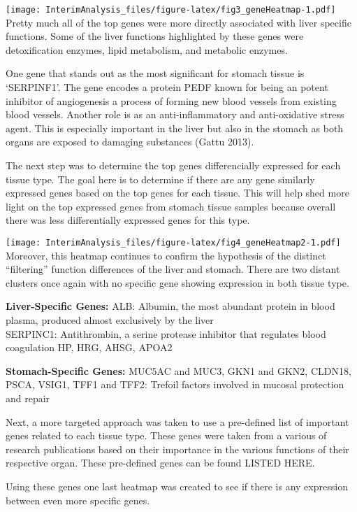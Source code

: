\documentclass[
]{article}
\begin{document}
\texttt{[image: InterimAnalysis\_files/figure-latex/fig3\_geneHeatmap-1.pdf]}
Pretty much all of the top genes were more directly associated with
liver specific functions. Some of the liver functions highlighted by
these genes were detoxification enzymes, lipid metabolism, and metabolic
enzymes.

One gene that stands out as the most significant for stomach tissue is
`SERPINF1'. The gene encodes a protein PEDF known for being an potent
inhibitor of angiogenesis a process of forming new blood vessels from
existing blood vessels. Another role is as an anti-inflammatory and
anti-oxidative stress agent. This is especially important in the liver
but also in the stomach as both organs are exposed to damaging
substances (Gattu 2013).

The next step was to determine the top genes differencially expressed
for each tissue type. The goal here is to determine if there are any
gene similarly expressed genes based on the top genes for each tissue.
This will help shed more light on the top expressed genes from stomach
tissue samples because overall there was less differentially expressed
genes for this type.

\texttt{[image: InterimAnalysis\_files/figure-latex/fig4\_geneHeatmap2-1.pdf]}
Moreover, this heatmap continues to confirm the hypothesis of the
distinct ``filtering'' function differences of the liver and stomach.
There are two distant clusters once again with no specific gene showing
expression in both tissue type.

\textbf{Liver-Specific Genes:} ALB: Albumin, the most abundant protein
in blood plasma, produced almost exclusively by the liver\\
SERPINC1: Antithrombin, a serine protease inhibitor that regulates blood
coagulation HP, HRG, AHSG, APOA2

\textbf{Stomach-Specific Genes:} MUC5AC and MUC3, GKN1 and GKN2, CLDN18,
PSCA, VSIG1, TFF1 and TFF2: Trefoil factors involved in mucosal
protection and repair

Next, a more targeted approach was taken to use a pre-defined list of
important genes related to each tissue type. These genes were taken from
a various of research publications based on their importance in the
various functions of their respective organ. These pre-defined genes can
be found LISTED HERE.

Using these genes one last heatmap was created to see if there is any
expression between even more specific genes.
\end{document}
